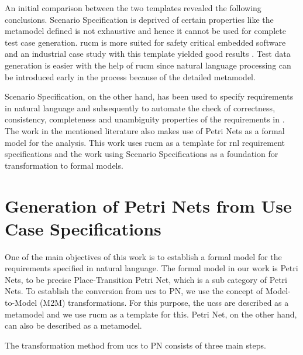 An initial comparison between the two templates revealed the following conclusions. Scenario Specification is deprived of certain properties like the metamodel defined is not exhaustive and hence it cannot be used for complete test case generation. \gls{rucm} is more suited for safety critical embedded software and an industrial case study with this template yielded good results \cite{wang2015umtg}. Test data generation is easier with the help of \gls{rucm} since natural language processing can be introduced early in the process because of the detailed metamodel. 

Scenario Specification, on the other hand, has been used to specify requirements in natural language and subsequently to automate the check of correctness, consistency, completeness and unambiguity properties of the requirements in \cite{calisaya2016analysis}. The work in the mentioned literature also makes use of Petri Nets as a formal model for the analysis. This work uses \gls{rucm} as a template for \gls{rnl} requirement specifications and the work using Scenario Specifications as a foundation for transformation to formal models. 


\section{Generation of Petri Nets from Use Case Specifications}\label{integratedpngen}
One of the main objectives of this work is to establish a formal model for the requirements specified in natural language. The formal model in our work is Petri Nets, to be precise Place-Transition Petri Net, which is a sub category of Petri Nets. To establish the conversion from \gls{ucs} to PN, we use the concept of Model-to-Model (M2M) transformations. For this purpose, the \glspl{ucs} are described as a metamodel and we use \gls{rucm} as a template for this. Petri Net, on the other hand, can also be described as a metamodel.

The transformation method from \gls{ucs} to PN consists of three main steps.

